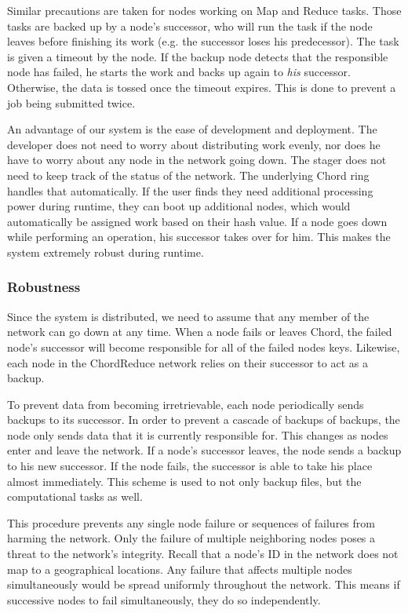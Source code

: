 Similar precautions are taken for nodes working on Map and Reduce tasks.
Those tasks are backed up by a node's successor, who will run the task if the node leaves before finishing its work (e.g. the successor loses his predecessor).
The task is given a timeout by the node.
If the backup node detects that the responsible node has failed, he starts the work and backs up again to \emph{his} successor.
Otherwise, the data is tossed once the timeout expires.
This is done to prevent a job being submitted twice.

An advantage of our system is the ease of development and deployment.
The developer does not need to worry about distributing work evenly, nor does he have to worry about any node in the network going down.
The stager does not need to keep track of the status of the network.
The underlying Chord ring handles that automatically.
If the user finds they need additional processing power during runtime, they can boot up additional nodes, which would automatically be assigned work based on their hash value.
If a node goes down while performing an operation, his successor takes over for him.
This makes the system extremely robust during runtime.


\subsubsection{Robustness}
Since the system is distributed, we need to assume that any member of the network can go down at any time.
When a node fails or leaves Chord, the failed node's successor will become responsible for all of the failed nodes keys.
Likewise, each node in the ChordReduce network relies on their successor to act as a backup.

To prevent data from becoming irretrievable, each node periodically sends backups to its successor.
In order to prevent a cascade of backups of backups, the node only sends data that it is currently responsible for.
This changes as nodes enter and leave the network.
If a node's successor leaves, the node sends a backup to his new successor.
If the node fails, the successor is able to take his place almost immediately.
This scheme is used to not only backup files, but the computational tasks as well.

This procedure prevents any single node failure or sequences of failures from harming the network.
Only the failure of multiple neighboring nodes poses a threat to the network's integrity.
Recall that a node's ID in the network does not map to a geographical locations.
Any failure that affects multiple nodes simultaneously would be spread uniformly throughout the network.
This means if successive nodes to fail simultaneously, they do so independently.

